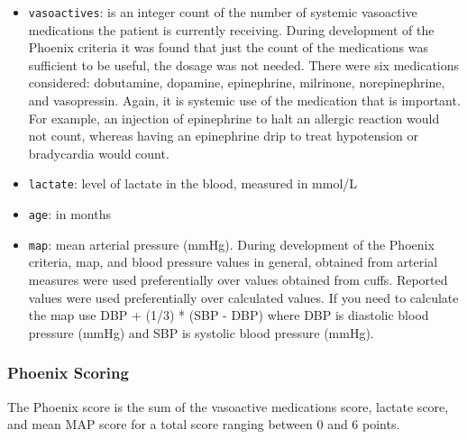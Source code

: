 \documentclass[
  letterpaper,
  DIV=11,
  numbers=noendperiod]{scrartcl}
\begin{document}
\begin{itemize}
\item
  \texttt{vasoactives}: is an integer count of the number of systemic
  vasoactive medications the patient is currently receiving. During
  development of the Phoenix criteria it was found that just the count
  of the medications was sufficient to be useful, the dosage was not
  needed. There were six medications considered: dobutamine, dopamine,
  epinephrine, milrinone, norepinephrine, and vasopressin. Again, it is
  systemic use of the medication that is important. For example, an
  injection of epinephrine to halt an allergic reaction would not count,
  whereas having an epinephrine drip to treat hypotension or bradycardia
  would count.
\item
  \texttt{lactate}: level of lactate in the blood, measured in mmol/L
\item
  \texttt{age}: in months
\item
  \texttt{map}: mean arterial pressure (mmHg). During development of the
  Phoenix criteria, map, and blood pressure values in general, obtained
  from arterial measures were used preferentially over values obtained
  from cuffs. Reported values were used preferentially over calculated
  values. If you need to calculate the map use DBP + (1/3) * (SBP - DBP)
  where DBP is diastolic blood pressure (mmHg) and SBP is systolic blood
  pressure (mmHg).
\end{itemize}

\subsubsection{Phoenix Scoring}\label{phoenix-scoring-1}

The Phoenix score is the sum of the vasoactive medications score,
lactate score, and mean MAP score for a total score ranging between 0
and 6 points.
\end{document}
